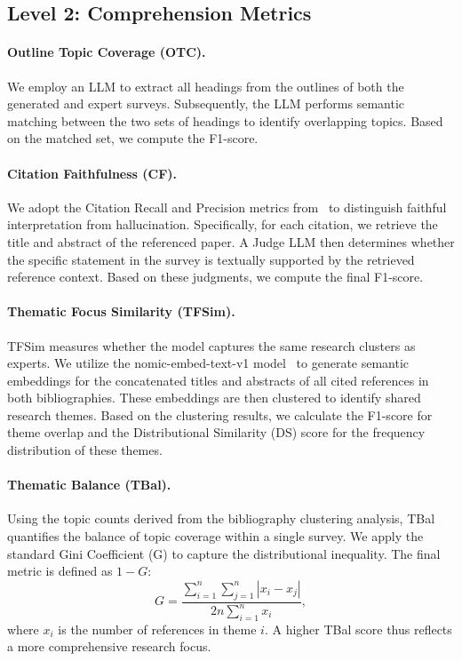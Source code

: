 \documentclass[11pt]{article}
\begin{document}
\subsection{Level 2: Comprehension Metrics}
\label{sec:app_l2}

\paragraph{Outline Topic Coverage (OTC).}
We employ an LLM to extract all headings from the outlines of both the generated and expert surveys. Subsequently, the LLM performs semantic matching between the two sets of headings to identify overlapping topics. Based on the matched set, we compute the F1-score.

\paragraph{Citation Faithfulness (CF).}
We adopt the Citation Recall and Precision metrics from~\cite{wang2024autosurvey} to distinguish faithful interpretation from hallucination. Specifically, for each citation, we retrieve the title and abstract of the referenced paper. A Judge LLM then determines whether the specific statement in the survey is textually supported by the retrieved reference context. Based on these judgments, we compute the final F1-score.

\paragraph{Thematic Focus Similarity (TFSim).}
TFSim measures whether the model captures the same research clusters as experts. We utilize the nomic-embed-text-v1 model~\cite{nussbaum2025nomic} to generate semantic embeddings for the concatenated titles and abstracts of all cited references in both bibliographies. These embeddings are then clustered to identify shared research themes. Based on the clustering results, we calculate the F1-score for theme overlap and the Distributional Similarity (DS) score for the frequency distribution of these themes.

\paragraph{Thematic Balance (TBal).}
Using the topic counts derived from the bibliography clustering analysis, TBal quantifies the balance of topic coverage within a single survey. We apply the standard Gini Coefficient (G) \cite{gini1912variabilita} to capture the distributional inequality. The final metric is defined as \(1 - G\):
    {
    \setlength{\abovedisplayskip}{6pt}%
    \setlength{\belowdisplayskip}{6pt}%
    \begin{equation}
    G = \frac{\sum_{i=1}^{n} \sum_{j=1}^{n} |x_i - x_j|}{2n \sum_{i=1}^{n} x_i} ,
    \end{equation}
    }
    where $x_i$ is the number of references in theme $i$. A higher TBal score thus reflects a more comprehensive research focus.
\end{document}

